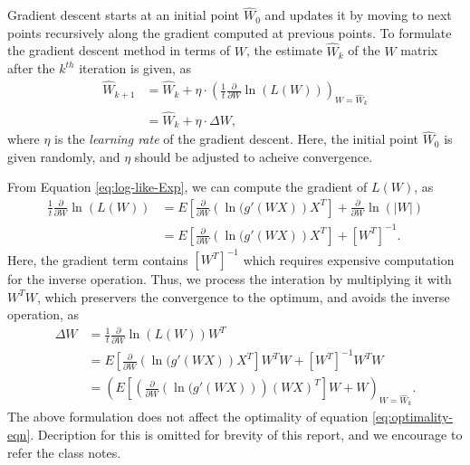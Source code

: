 \documentclass[conference]{IEEEtran}
\begin{document}
Gradient descent starts at an initial point $\hat{W}_0$ and updates it by moving to next points recursively along the gradient computed at previous points. To formulate the gradient descent method in terms of $W$, the estimate $\hat{W}_{k}$ of the $W$ matrix after the $k^{th}$ iteration is given, as 
\begin{equation}
\begin{aligned}
    \hat{W}_{k+1} &= \hat{W}_k + \eta\cdot\left(\frac{1}{t}\frac{\partial}{\partial W}\ln(L(W))\right)_{W=\hat{W}_k}\\
     &= \hat{W}_k + \eta\cdot\Delta W,
\end{aligned}
\end{equation}
where $\eta$ is the {\it learning rate} of the gradient descent.
Here, the initial point $\hat{W}_0$ is given randomly, and $\eta$ should be adjusted to acheive convergence.

From Equation \ref{eq:log-like-Exp}, we can compute the gradient of $L(W)$, as
\begin{equation}
\begin{aligned}
    \frac{1}{t}\frac{\partial}{\partial W}\ln(L(W)) 
    &= E\left[\frac{\partial}{\partial W}(\ln{(g'(WX)})X^T\right] + \frac{\partial}{\partial W}\ln{(|W|)} \\
    &= E\left[\frac{\partial}{\partial W}(\ln{(g'(WX)})X^T\right] + \left[W^T\right]^{-1}.
\end{aligned}
\end{equation}
Here, the gradient term contains $\left[W^T\right]^{-1}$ which requires expensive computation for the inverse operation. 
Thus, we process the interation by multiplying it with $W^TW$, which preservers the convergence to the optimum, and avoids the inverse operation, as
\begin{equation}
\begin{aligned}
    \Delta W
    &= \frac{1}{t}\frac{\partial}{\partial W}\ln(L(W)) W^T \\
    &= E\left[\frac{\partial}{\partial W}(\ln{(g'(WX)})X^T\right] W^TW + \left[W^T\right]^{-1} W^TW \\
    &= \left(E\left[\left(\frac{\partial}{\partial W}(\ln{(g'(WX)})\right)(WX)^T\right] W + W\right)_{W=\hat{W}_k}.
    \label{eq:delta W simplified}
\end{aligned}
\end{equation}
The above formulation does not affect the  optimality of equation \ref{eq:optimality-eqn}. Decription for this is omitted for brevity of this report, and we encourage to refer the class notes.
\end{document}
